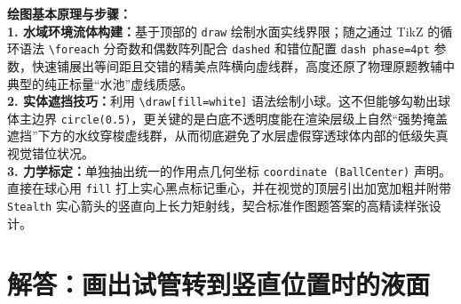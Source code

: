 \vspace{0.6cm}

{\small\color{blue!70!black}
\textbf{绘图基本原理与步骤：}\\
\textbf{1. 水域环境流体构建：}基于顶部的 \texttt{draw} 绘制水面实线界限；随之通过 TikZ 的循环语法 \texttt{\textbackslash foreach} 分奇数和偶数阵列配合 \texttt{dashed} 和错位配置 \texttt{dash phase=4pt} 参数，快速铺展出等间距且交错的精美点阵横向虚线群，高度还原了物理原题教辅中典型的纯正标量“水池”虚线质感。\\
\textbf{2. 实体遮挡技巧：}利用 \texttt{\textbackslash draw[fill=white]} 语法绘制小球。这不但能够勾勒出球体主边界 \texttt{circle(0.5)}，更关键的是白底不透明度能在渲染层级上自然“强势掩盖遮挡”下方的水纹穿梭虚线群，从而彻底避免了水层虚假穿透球体内部的低级失真视觉错位状况。\\
\textbf{3. 力学标定：}单独抽出统一的作用点几何坐标 \texttt{coordinate (BallCenter)} 声明。直接在球心用 \texttt{fill} 打上实心黑点标记重心，并在视觉的顶层引出加宽加粗并附带 \texttt{Stealth} 实心箭头的竖直向上长力矩射线，契合标准作图题答案的高精读样张设计。
}

\vspace{1.0cm}



\section{解答：画出试管转到竖直位置时的液面}

\vspace{0.6cm}

